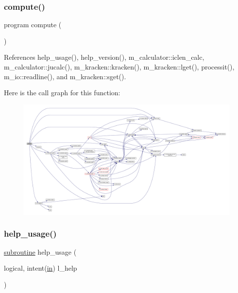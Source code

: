 \subsubsection{\texorpdfstring{compute()}{compute()}}
{\footnotesize\ttfamily program compute (\begin{DoxyParamCaption}{ }\end{DoxyParamCaption})}



References help\+\_\+usage(), help\+\_\+version(), m\+\_\+calculator\+::iclen\+\_\+calc, m\+\_\+calculator\+::jucalc(), m\+\_\+kracken\+::kracken(), m\+\_\+kracken\+::lget(), processit(), m\+\_\+io\+::readline(), and m\+\_\+kracken\+::sget().

Here is the call graph for this function\+:
\nopagebreak
\begin{figure}[H]
\begin{center}
\leavevmode
\includegraphics[width=350pt]{compute_8f90_ad31daef7ea6df41611fcaae1171ce54a_cgraph}
\end{center}
\end{figure}
\mbox{\label{compute_8f90_a3e09a3b52ee8fb04eeb93fe5761626a8}} 
\subsubsection{\texorpdfstring{help\+\_\+usage()}{help\_usage()}}
{\footnotesize\ttfamily \hyperlink{M__stopwatch_83_8txt_acfbcff50169d691ff02d4a123ed70482}{subroutine} help\+\_\+usage (\begin{DoxyParamCaption}\item[{logical, intent(\hyperlink{M__journal_83_8txt_afce72651d1eed785a2132bee863b2f38}{in})}]{l\+\_\+help }\end{DoxyParamCaption})}



